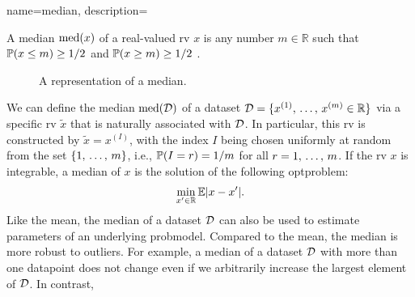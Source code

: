 {name={median},
	description={A median $\mathrm{med}(x)$ of a real-valued \gls{rv} $x$ 
		is any number $m \in \mathbb{R}$ such that $\mathbb{P}({ x \leq m}) \geq 1/2$ and $\mathbb{P}({ x \geq m}) \geq 1/2$ \cite{LC}. 
 		\begin{figure}[H]
			\begin{center}
			\end{center}
			\caption{A representation of a median.}
 		\end{figure}  
 		We can define the median $\mathrm{med}(\mathcal{D})$ 
 		of a \gls{dataset} $\mathcal{D} = \{ x^{(1)}, \,\ldots, \,x^{(m)} \in \mathbb{R} \}$ 
 		via a specific \gls{rv} $\tilde{x}$ that is naturally associated with $\mathcal{D}$. 
 		In particular, this \gls{rv} is constructed by $\tilde{x} = x^{(I)}$, with the index $I$ 
 		being chosen uniformly at random from the set $\{1, \,\ldots, \,m\}$, i.e., $\mathbb{P}({I = r})=1/m$ for 
 		all $r=1, \,\ldots, \,m$. If the \gls{rv} $x$ is integrable, a median of $x$ 
 		is the solution of the following \gls{optproblem}: 
 		$$\min_{x' \in \mathbb{R}} \mathbb{E}{|x - x'|}.$$ 
 		Like the \gls{mean}, the median of a \gls{dataset} $\mathcal{D}$ can also be used 
 		to estimate \gls{parameter}s of an underlying \gls{probmodel}. Compared 
 		to the \gls{mean}, the median is more robust to \gls{outlier}s. For example, 
 		a median of a \gls{dataset} $\mathcal{D}$ with more than one \gls{datapoint} does not 
 		change even if we arbitrarily increase the largest element of $\mathcal{D}$. In contrast, 
}}
